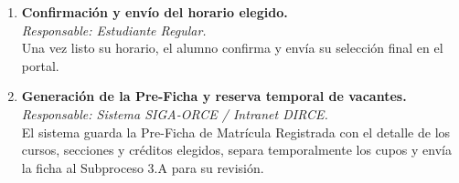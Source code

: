 \begin{enumerate}
    \item \textbf{Confirmación y envío del horario elegido.} \\
    \textit{Responsable: Estudiante Regular.} \\
    Una vez listo su horario, el alumno confirma y envía su selección final en el portal.

    \item \textbf{Generación de la Pre-Ficha y reserva temporal de vacantes.} \\
    \textit{Responsable: Sistema SIGA-ORCE / Intranet DIRCE.} \\
    El sistema guarda la Pre-Ficha de Matrícula Registrada con el detalle de los cursos, secciones y créditos elegidos, separa temporalmente los cupos y envía la ficha al Subproceso 3.A para su revisión.
\end{enumerate}
